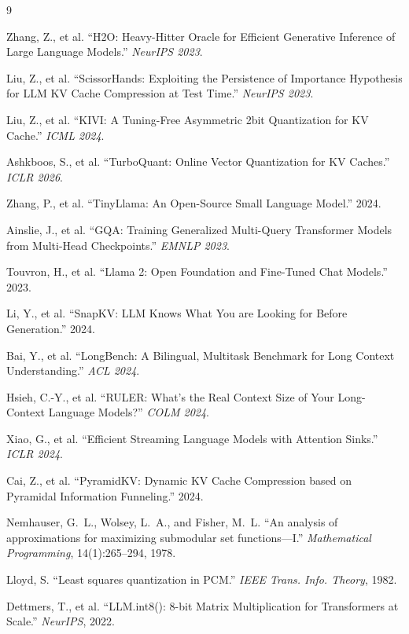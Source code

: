 \documentclass[11pt,a4paper]{article}
\begin{document}

\begin{thebibliography}{9}

Zhang, Z., et al. ``H2O: Heavy-Hitter Oracle for Efficient Generative Inference of Large Language Models.'' \textit{NeurIPS 2023}.

Liu, Z., et al. ``ScissorHands: Exploiting the Persistence of Importance Hypothesis for LLM KV Cache Compression at Test Time.'' \textit{NeurIPS 2023}.

Liu, Z., et al. ``KIVI: A Tuning-Free Asymmetric 2bit Quantization for KV Cache.'' \textit{ICML 2024}.

Ashkboos, S., et al. ``TurboQuant: Online Vector Quantization for KV Caches.'' \textit{ICLR 2026}.

Zhang, P., et al. ``TinyLlama: An Open-Source Small Language Model.'' 2024.

Ainslie, J., et al. ``GQA: Training Generalized Multi-Query Transformer Models from Multi-Head Checkpoints.'' \textit{EMNLP 2023}.

Touvron, H., et al. ``Llama 2: Open Foundation and Fine-Tuned Chat Models.'' 2023.

Li, Y., et al. ``SnapKV: LLM Knows What You are Looking for Before Generation.'' 2024.

Bai, Y., et al. ``LongBench: A Bilingual, Multitask Benchmark for Long Context Understanding.'' \textit{ACL 2024}.

Hsieh, C.-Y., et al. ``RULER: What's the Real Context Size of Your Long-Context Language Models?'' \textit{COLM 2024}.

Xiao, G., et al. ``Efficient Streaming Language Models with Attention Sinks.'' \textit{ICLR 2024}.

Cai, Z., et al. ``PyramidKV: Dynamic KV Cache Compression based on Pyramidal Information Funneling.'' 2024.

Nemhauser, G.~L., Wolsey, L.~A., and Fisher, M.~L. ``An analysis of approximations for maximizing submodular set functions---I.'' \textit{Mathematical Programming}, 14(1):265--294, 1978.

Lloyd, S. ``Least squares quantization in PCM.'' \textit{IEEE Trans. Info. Theory}, 1982.

Dettmers, T., et al. ``LLM.int8(): 8-bit Matrix Multiplication for Transformers at Scale.'' \textit{NeurIPS}, 2022.

\end{thebibliography}
\end{document}
